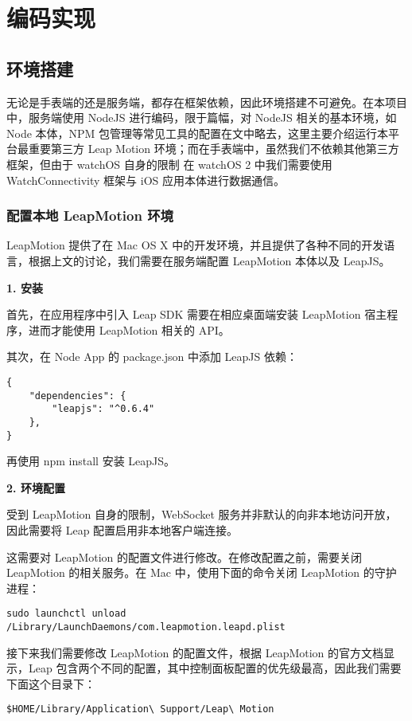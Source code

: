 \chapter{编码实现}

\section{环境搭建}

无论是手表端的还是服务端，都存在框架依赖，因此环境搭建不可避免。在本项目中，服务端使用 NodeJS 进行编码，限于篇幅，对 NodeJS 相关的基本环境，如 Node 本体，NPM 包管理等常见工具的配置在文中略去，这里主要介绍运行本平台最重要第三方 Leap Motion 环境；而在手表端中，虽然我们不依赖其他第三方框架，但由于 watchOS 自身的限制\cite{WatchConnectivity:2016} 在 watchOS 2 中我们需要使用 WatchConnectivity 框架与 iOS 应用本体进行数据通信。

\subsection{配置本地 LeapMotion 环境}

LeapMotion 提供了在 Mac OS X 中的开发环境，并且提供了各种不同的开发语言，根据上文的讨论，我们需要在服务端配置 LeapMotion 本体以及 LeapJS。

\textbf{1. 安装}

首先，在应用程序中引入 Leap SDK 需要在相应桌面端安装 LeapMotion 宿主程序，进而才能使用 LeapMotion 相关的 API。

其次，在 Node App 的 package.json 中添加 LeapJS 依赖：
\begin{lstlisting}
{
    "dependencies": {
        "leapjs": "^0.6.4"
    },
}
\end{lstlisting}
再使用 npm install 安装 LeapJS。

\textbf{2. 环境配置}

受到 LeapMotion 自身的限制\cite{Leap:2016}，WebSocket 服务并非默认的向非本地访问开放，因此需要将 Leap 配置启用非本地客户端连接。

这需要对 LeapMotion 的配置文件进行修改。在修改配置之前，需要关闭 LeapMotion 的相关服务。在 Mac 中，使用下面的命令关闭 LeapMotion 的守护进程：
\begin{lstlisting}
sudo launchctl unload /Library/LaunchDaemons/com.leapmotion.leapd.plist
\end{lstlisting}

接下来我们需要修改 LeapMotion 的配置文件，根据 LeapMotion 的官方文档显示，Leap 包含两个不同的配置，其中控制面板配置的优先级最高，因此我们需要下面这个目录下：
\begin{lstlisting}
$HOME/Library/Application\ Support/Leap\ Motion
\end{lstlisting}

